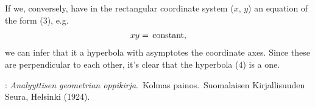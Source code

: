 \documentclass[12pt]{article}
\theoremstyle{definition}
\begin{document}
If we, conversely, have in the rectangular coordinate system ($x,\,y$) an equation of the form (3), e.g.
\begin{align}           
       xy = \mbox{\,constant},
\end{align}
we can infer that it  a hyperbola with asymptotes the coordinate axes.  Since these are perpendicular to each other, it's clear that the hyperbola (4) is a  one.

\begin{thebibliography}{8}
: {\em Analyyttisen geometrian oppikirja}.\, Kolmas painos.\, Suomalaisen Kirjallisuuden Seura, Helsinki (1924).
\end{thebibliography}


\end{document}
